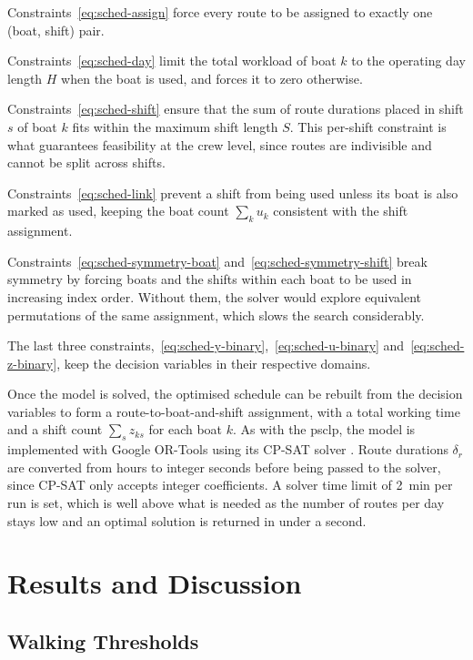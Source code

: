 \documentclass[12pt]{article}
\begin{document}
Constraints~\eqref{eq:sched-assign} force every route to be assigned to exactly one (boat, shift) pair.

Constraints~\eqref{eq:sched-day} limit the total workload of boat \(k\) to the operating day length \(H\) when the boat is used, and forces it to zero otherwise.

Constraints~\eqref{eq:sched-shift} ensure that the sum of route durations placed in shift \(s\) of boat \(k\) fits within the maximum shift length \(S\). This per-shift constraint is what guarantees feasibility at the crew level, since routes are indivisible and cannot be split across shifts.

Constraints~\eqref{eq:sched-link} prevent a shift from being used unless its boat is also marked as used, keeping the boat count \(\sum_k u_k\) consistent with the shift assignment.

Constraints~\eqref{eq:sched-symmetry-boat} and~\eqref{eq:sched-symmetry-shift} break symmetry by forcing boats and the shifts within each boat to be used in increasing index order. Without them, the solver would explore equivalent permutations of the same assignment, which slows the search considerably.

The last three constraints,~\eqref{eq:sched-y-binary},~\eqref{eq:sched-u-binary} and~\eqref{eq:sched-z-binary}, keep the decision variables in their respective domains.

Once the model is solved, the optimised schedule can be rebuilt from the decision variables to form a route-to-boat-and-shift assignment, with a total working time and a shift count \(\sum_s z_{ks}\) for each boat \(k\). As with the \ac{psclp}, the model is implemented with Google OR-Tools \parencite{ortools} using its CP-SAT solver \parencite{cpsat}. Route durations \(\delta_r\) are converted from hours to integer seconds before being passed to the solver, since CP-SAT only accepts integer coefficients. A solver time limit of \qty{2}{\minute} per run is set, which is well above what is needed as the number of routes per day stays low and an optimal solution is returned in under a second.

\section{Results and Discussion}
\label{sec:results-and-discussion}

\subsection{Walking Thresholds}
\label{subsec:walking-thresholds}
\end{document}
